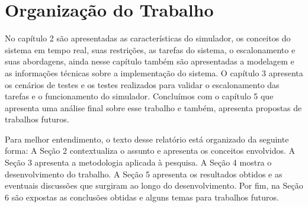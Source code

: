 \section{Organização do Trabalho}

No capítulo 2 são apresentadas as características do simulador, os conceitos do sistema em tempo real, suas restrições, as tarefas do sistema, o escalonamento e suas abordagens, ainda nesse capítulo também são apresentadas a modelagem e as informações técnicas sobre a implementação do sistema. O capítulo 3 apresenta os cenários de testes e os testes realizados para validar o escalonamento das tarefas e o funcionamento do simulador. Concluímos com o capítulo 5 que apresenta uma análise final sobre esse trabalho e também, apresenta propostas de trabalhos futuros.

Para melhor entendimento, o texto desse relatório está organizado da seguinte forma: A Seção 2 contextualiza o assunto e apresenta os conceitos envolvidos. A Seção 3 apresenta a metodologia aplicada à pesquisa. A Seção 4 mostra o desenvolvimento do trabalho. A Seção 5 apresenta os resultados obtidos e as eventuais discussões que surgiram ao longo do desenvolvimento. Por fim, na Seção 6 são expostas as conclusões obtidas e alguns temas para trabalhos futuros.